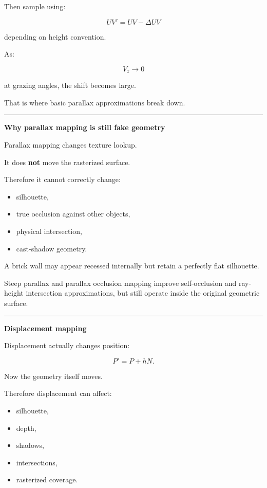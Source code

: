 Then sample using:

\[
UV'=UV-\Delta UV
\]

depending on height convention.

As:

\[
V_z\rightarrow0
\]

at grazing angles, the shift becomes large.

That is where basic parallax approximations break down.

\begin{center}\rule{0.5\linewidth}{0.5pt}\end{center}

\textbf{Why parallax mapping is still fake geometry}

Parallax mapping changes texture lookup.

It does \textbf{not} move the rasterized surface.

Therefore it cannot correctly change:

\begin{itemize}
\tightlist
\item
  silhouette,
\item
  true occlusion against other objects,
\item
  physical intersection,
\item
  cast-shadow geometry.
\end{itemize}

A brick wall may appear recessed internally but retain a perfectly flat silhouette.

Steep parallax and parallax occlusion mapping improve self-occlusion and ray-height intersection approximations, but still operate inside the original geometric surface.

\begin{center}\rule{0.5\linewidth}{0.5pt}\end{center}

\textbf{Displacement mapping}

Displacement actually changes position:

\[
\boxed{
P'=P+hN.
}
\]

Now the geometry itself moves.

Therefore displacement can affect:

\begin{itemize}
\tightlist
\item
  silhouette,
\item
  depth,
\item
  shadows,
\item
  intersections,
\item
  rasterized coverage.
\end{itemize}

